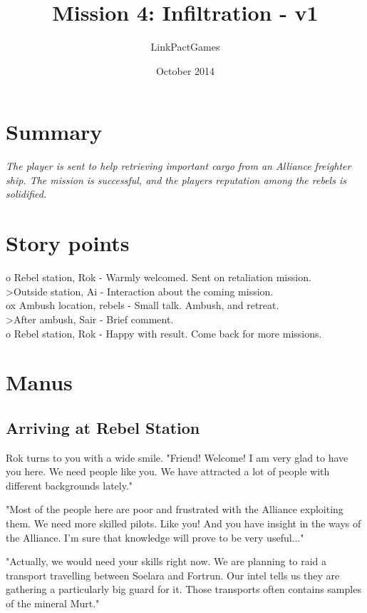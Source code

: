\documentclass[a4paper,12pt]{article}
\begin{document}
\title{Mission 4: Infiltration - v1}
\author{LinkPactGames}
\date{October 2014}
\maketitle

\section{Summary}

\textit{The player is sent to help retrieving important cargo from an
Alliance freighter ship. The mission is successful, and the
players reputation among the rebels is solidified.}

\section{Story points}

o Rebel station, Rok - Warmly welcomed. Sent on retaliation mission.\\
\textgreater Outside station, Ai - Interaction about the coming mission.\\
ox Ambush location, rebels - Small talk. Ambush, and retreat.\\
\textgreater After ambush, Sair - Brief comment.\\
o Rebel station, Rok - Happy with result. Come back for more missions.\\

\section{Manus}

\subsection{Arriving at Rebel Station}

Rok turns to you with a wide smile. "Friend! Welcome! I am very glad to
have you here. We need people like you. We have attracted a lot of people
with different backgrounds lately." 

"Most of the people here are poor and frustrated with the
Alliance exploiting them. We need more
skilled pilots. Like you! And you have insight in the ways of the Alliance.
I'm sure that knowledge will prove to be very useful..."

"Actually, we would need your skills right now. We are planning to raid a
transport travelling between Soelara and Fortrun. Our intel tells us they are
gathering a particularly big guard for it. Those transports often contains
samples of the mineral Murt."
\end{document}
